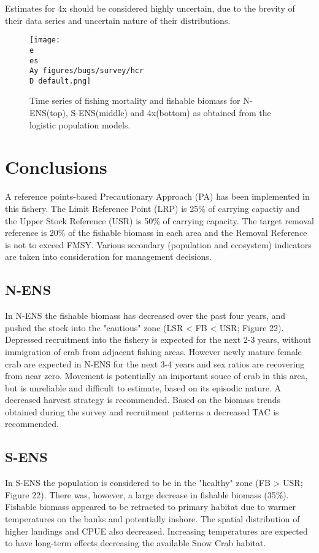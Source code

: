 \documentclass[paper=a4, fontsize=11pt]{article}
\newcommand{\D}{.}
\newcommand{\e}{/home/michelle/ecomod_data/}
\newcommand{\es}{snowcrab/}
\newcommand{\Ay}{assessments/2015/}
\begin{document}
Estimates for 4x should be considered highly uncertain, due to the brevity of their data series and uncertain nature of their distributions. 

\begin{figure}[h]
  \centering
     \texttt{[image: \\e \\es \\Ay figures/bugs/survey/hcr\\D default.png]}
    \caption{Time series of fishing mortality and fishable biomass for N-ENS(top), S-ENS(middle) and 4x(bottom) as obtained from the logistic population models.}
\end{figure}

\section{Conclusions}
A reference points-based Precautionary Approach (PA) has been implemented in this fishery. The Limit Reference Point (LRP) is 25\% of carrying capactiy and the Upper Stock Reference (USR) is 50\% of carrying capacity. The target removal reference is 20\% of the fishable biomass in each area and the Removal Reference is not to exceed FMSY. Various secondary (population and ecosystem) indicators are taken into consideration for management decisions. 

\subsection{N-ENS}
In N-ENS the fishable biomass has decreased over the past four years, and pushed the stock into the "cautious" zone (LSR < FB < USR; Figure 22). 
 Depressed recruitment into the fishery is expected for the next 2-3 years, without immigration of crab from adjacent fishing areas. However newly mature female crab are expected in N-ENS for the next 3-4 years and sex ratios are recovering from near zero. Movement is potentially an important souce of crab in this area, but is unreliable and difficult to estimate, based on its episodic nature. A decreased harvest strategy is recommended. Based on the biomass trends obtained during the survey and recruitment patterns a decreased TAC is recommended. 

\subsection{S-ENS}
In S-ENS the population is considered to be in the "healthy" zone (FB > USR; Figure 22). There was, however, a large decrease in fishable biomass (35\%). Fishable biomass appeared to be retracted to primary habitat due to warmer temperatures on the banks and potentially inshore. The spatial distribution of higher landings and CPUE also decreased. Increasing temperatures are expected to have long-term effects decreasing the available Snow Crab habitat. \\
\end{document}
